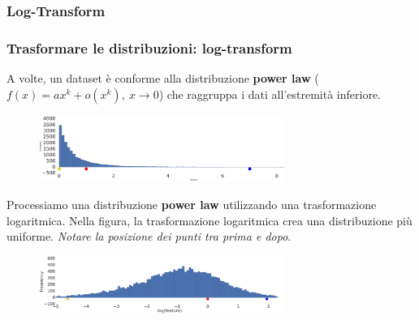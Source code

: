 \subsubsection[Log-Transform]{Log-Transform}
\begin{frame}
	
	\frametitle{{\color{GradientDescentDiagramOrange}Trasformare le distribuzioni}: {\color{GradientDescentDiagramRed}log-transform}}
		
		A volte, un dataset è conforme alla distribuzione \textbf{power law} ($f(x) = ax^k + o(x^k), \ x \to 0$) che raggruppa i dati all'estremità inferiore.\\
		\begin{figure}[!htbp]
			\centering
			\includegraphics[width=8.0cm]{images/data_prep/scaling_distributions/LeftSkew.png}
		\end{figure}
		
		Processiamo una distribuzione \textbf{power law} utilizzando una trasformazione logaritmica.
		Nella figura, la trasformazione logaritmica crea una distribuzione più uniforme. \textit{Notare la posizione dei punti tra prima e dopo}.
		
		\begin{figure}[!htbp]
			\centering
			\includegraphics[width=8.0cm]{images/data_prep/scaling_distributions/NormalDistribution.png}
		\end{figure}
	
\end{frame}

